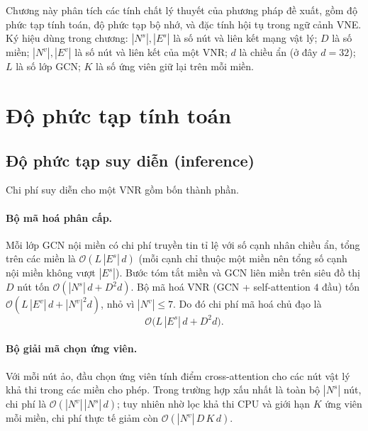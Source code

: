 \documentclass[../DoAn.tex]{subfiles}
\begin{document}
\label{ch:phan_tich}

Chương này phân tích các tính chất lý thuyết của phương pháp đề xuất, gồm độ phức tạp tính toán, độ phức tạp bộ nhớ, và đặc tính hội tụ trong ngữ cảnh VNE. Ký hiệu dùng trong chương: $|N^s|, |E^s|$ là số nút và liên kết mạng vật lý; $D$ là số miền; $|N^v|, |E^v|$ là số nút và liên kết của một VNR; $d$ là chiều ẩn (ở đây $d=32$); $L$ là số lớp GCN; $K$ là số ứng viên giữ lại trên mỗi miền.

\section{Độ phức tạp tính toán}              %
\label{sec:complexity-time}

\subsection{Độ phức tạp suy diễn (inference)}
\label{subsec:complexity-infer}

Chi phí suy diễn cho một VNR gồm bốn thành phần.

\paragraph{Bộ mã hoá phân cấp.} Mỗi lớp GCN nội miền có chi phí truyền tin tỉ lệ với số cạnh nhân chiều ẩn, tổng trên các miền là $\mathcal{O}(L\,|E^s|\,d)$ (mỗi cạnh chỉ thuộc một miền nên tổng số cạnh nội miền không vượt $|E^s|$). Bước tóm tắt miền và GCN liên miền trên siêu đồ thị $D$ nút tốn $\mathcal{O}(|N^s|\,d + D^2 d)$. Bộ mã hoá VNR (GCN + self-attention $4$ đầu) tốn $\mathcal{O}(L\,|E^v|\,d + |N^v|^2 d)$, nhỏ vì $|N^v|\le 7$. Do đó chi phí mã hoá chủ đạo là
\begin{equation}
    \mathcal{O}\big( L\,|E^s|\,d + D^2 d \big).
    \label{eq:enc-cost}
\end{equation}

\paragraph{Bộ giải mã chọn ứng viên.} Với mỗi nút ảo, đầu chọn ứng viên tính điểm cross-attention cho các nút vật lý khả thi trong các miền cho phép. Trong trường hợp xấu nhất là toàn bộ $|N^s|$ nút, chi phí là $\mathcal{O}(|N^v|\,|N^s|\,d)$; tuy nhiên nhờ lọc khả thi CPU và giới hạn $K$ ứng viên mỗi miền, chi phí thực tế giảm còn $\mathcal{O}(|N^v|\,D\,K\,d)$.
\end{document}
